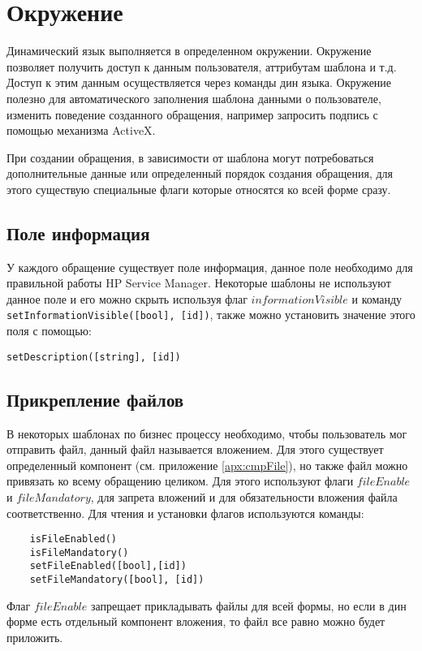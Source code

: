 \documentclass[../index.tex]{subfiles}
\begin{document}
\section{Окружение}  %

Динамический язык выполняется в определенном окружении. Окружение позволяет получить доступ к данным пользователя,
аттрибутам шаблона и т.д. Доступ к этим данным осуществляется через команды дин языка. 
Окружение полезно для автоматического заполнения шаблона данными о пользователе, изменить поведение созданного обращения,
например запросить подпись с помощью механизма ActiveX.

При создании обращения, в зависимости от шаблона могут потребоваться дополнительные данные или определенный порядок 
создания обращения, для этого существую специальные флаги которые относятся ко всей форме сразу.

\subsection{Поле информация}
У каждого обращение существует поле информация, данное поле необходимо для правильной работы HP Service Manager.
Некоторые шаблоны не используют данное поле и его можно скрыть используя флаг $informationVisible$ и команду
\verb|setInformationVisible([bool], [id])|, также можно установить значение этого поля с помощью:
\begin{verbatim}
setDescription([string], [id])
\end{verbatim}

\subsection{Прикрепление файлов}
В некоторых шаблонах по бизнес процессу необходимо, чтобы пользователь мог отправить файл, данный файл называется вложением.
Для этого существует определенный компонент (см. приложение \ref{apx:cmpFile}), но также файл можно привязать ко всему обращению целиком.
Для этого используют флаги $fileEnable$ и $fileMandatory$, для запрета вложений и для обязательности вложения файла соответственно.
Для чтения и установки флагов используются команды:
\begin{verbatim}
	isFileEnabled()
	isFileMandatory()
	setFileEnabled([bool],[id])
	setFileMandatory([bool], [id])
\end{verbatim}

Флаг $fileEnable$ запрещает прикладывать файлы для всей формы, но если в дин форме есть отдельный компонент вложения, то
файл все равно можно будет приложить.
\end{document}
